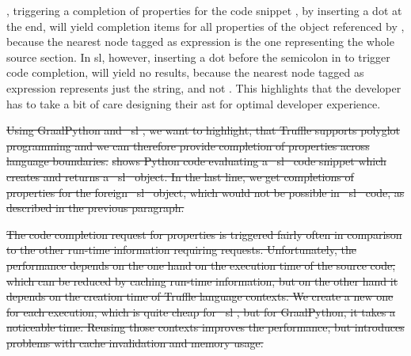 \documentclass[sigplan,10pt,review,anonymous]{acmart}
\providecommand{\DIFadd}[1]{{\protect\color{blue}\uwave{#1}}} %
\providecommand{\DIFdel}[1]{{\protect\color{red}\sout{#1}}}                      %
\providecommand{\DIFaddbegin}{} %
\providecommand{\DIFaddend}{} %
\providecommand{\DIFdelbegin}{} %
\begin{document}
\DIFadd{In Python}\DIFaddend , triggering a completion of properties for the code snippet
, by inserting a dot at the end, will yield
completion items for all properties of the object referenced by
, because the nearest node tagged as
expression is the one representing the whole source section. In \ac{sl},
however, inserting a dot before the semicolon in \DIFaddbegin \DIFadd{the expression
}\DIFaddend {} to trigger code completion, will yield no
results, because the nearest node tagged as expression represents just the
 string, and not
. This highlights that the developer has to
take a bit of care designing their \ac{ast} for optimal developer experience.

\DIFdelbegin \DIFdel{Using GraalPython and \mbox{%
\ac{sl}}\hspace{0pt}%
, we want to highlight, that Truffle supports
polyglot programming and we can therefore provide completion of properties
across language boundaries. }%
\DIFdel{shows Python
code evaluating a \mbox{%
\ac{sl} }\hspace{0pt}%
code snippet which creates and returns a \mbox{%
\ac{sl}
}\hspace{0pt}%
object. In the last line, we get completions of properties for the foreign
\mbox{%
\ac{sl} }\hspace{0pt}%
object, which would not be possible in \mbox{%
\ac{sl} }\hspace{0pt}%
code, as described in the
previous paragraph.
}%

\DIFdel{The code completion request for properties is triggered fairly often in
comparison to the other run-time information requiring requests. Unfortunately,
the performance depends on the one hand on the execution time of the source
code, which can be reduced by caching run-time information, but on the other
hand it depends on the creation time of Truffle language contexts. We create a
new one for each execution, which is quite cheap for \mbox{%
\ac{sl}}\hspace{0pt}%
, but for
GraalPython, it takes a noticeable time. Reusing those contexts improves the
performance, but introduces problems with cache invalidation and memory usage.
}%
\end{document}
